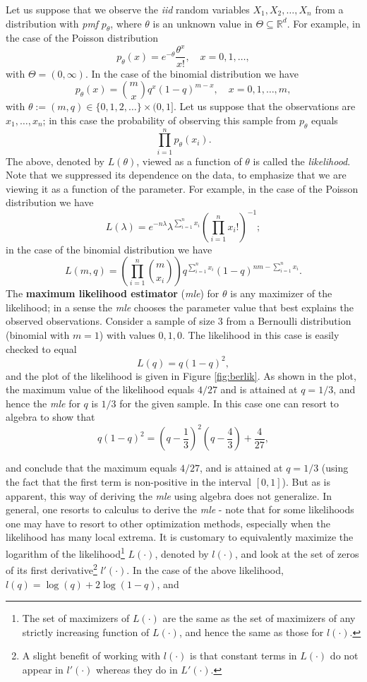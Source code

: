 \documentclass[]{book}
\let\rmarkdownfootnote\footnote%
\def\footnote{\protect\rmarkdownfootnote}
\theoremstyle{definition}
\theoremstyle{definition}
\theoremstyle{definition}
\theoremstyle{remark}
\begin{document}
Let us suppose that we observe the \emph{iid} random variables
\(X_1,X_2,\ldots,X_n\) from a distribution with \emph{pmf} \(p_\theta\),
where \(\theta\) is an unknown value in
\(\Theta\subseteq \mathbb{R}^d\). For example, in the case of the
Poisson distribution \[
p_\theta(x)=e^{-\theta}\frac{\theta^x}{x!}, \quad x=0,1,\ldots,
\] with \(\Theta=(0,\infty)\). In the case of the binomial distribution
we have \[
p_\theta(x)=\binom{m}{x} q^x(1-q)^{m-x}, \quad x=0,1,\ldots,m,
\] with \(\theta:=(m,q)\in \{0,1,2,\ldots\}\times(0,1]\). Let us suppose
that the observations are \(x_1,\ldots,x_n\); in this case the
probability of observing this sample from \(p_\theta\) equals \[
\prod_{i=1}^n p_\theta(x_i).
\] The above, denoted by \(L(\theta)\), viewed as a function of
\(\theta\) is called the \emph{likelihood}. Note that we suppressed its
dependence on the data, to emphasize that we are viewing it as a
function of the parameter. For example, in the case of the Poisson
distribution we have \[
L(\lambda)=e^{-n\lambda} \lambda^{\sum_{i=1}^n x_i} \left(\prod_{i=1}^n x_i!\right)^{-1};
\] in the case of the binomial distribution we have \[
L(m,q)=\left(\prod_{i=1}^n \binom{m}{x_i}\right) q^{\sum_{i=1}^n x_i} (1-q)^{nm-\sum_{i=1}^n x_i} .
\] The \textbf{maximum likelihood estimator} (\emph{mle}) for \(\theta\)
is any maximizer of the likelihood; in a sense the \emph{mle} chooses
the parameter value that best explains the observed observations.
Consider a sample of size \(3\) from a Bernoulli distribution (binomial
with \(m=1\)) with values \(0,1,0\). The likelihood in this case is
easily checked to equal \[
L(q)=q(1-q)^2,
\] and the plot of the likelihood is given in Figure \ref{fig:berlik}.
As shown in the plot, the maximum value of the likelihood equals
\(4/27\) and is attained at \(q=1/3\), and hence the \emph{mle} for
\(q\) is \(1/3\) for the given sample. In this case one can resort to
algebra to show that \[
q(1-q)^2=\left(q-\frac{1}{3}\right)^2\left(q-\frac{4}{3}\right)+\frac{4}{27},
\]

and conclude that the maximum equals \(4/27\), and is attained at
\(q=1/3\) (using the fact that the first term is non-positive in the
interval \([0,1]\)). But as is apparent, this way of deriving the
\emph{mle} using algebra does not generalize. In general, one resorts to
calculus to derive the \emph{mle} - note that for some likelihoods one
may have to resort to other optimization methods, especially when the
likelihood has many local extrema. It is customary to equivalently
maximize the logarithm of the likelihood\footnote{The set of maximizers
  of \(L(\cdot)\) are the same as the set of maximizers of any strictly
  increasing function of \(L(\cdot)\), and hence the same as those for
  \(l(\cdot)\).} \(L(\cdot)\), denoted by \(l(\cdot)\), and look at the
set of zeros of its first derivative\footnote{A slight benefit of
  working with \(l(\cdot)\) is that constant terms in \(L(\cdot)\) do
  not appear in \(l'(\cdot)\) whereas they do in \(L'(\cdot)\).}
\(l'(\cdot)\). In the case of the above likelihood,
\(l(q)=\log(q)+2\log(1-q)\), and
\end{document}
